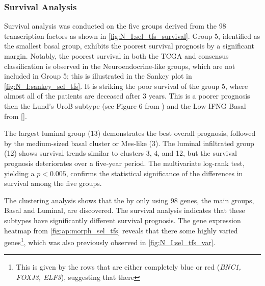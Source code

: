 \subsubsection*{Survival Analysis}

Survival analysis was conducted on the five groups derived from the 98 transcription factors as shown in \cref{fig:N_I:sel_tfs_survival}. Group 5, identified as the smallest basal group, exhibits the poorest survival prognosis by a significant margin. Notably, the poorest survival in both the TCGA and consensus classification is observed in the Neuroendocrine-like groups, which are not included in Group 5; this is illustrated in the Sankey plot in \cref{fig:N_I:sankey_sel_tfs}. It is striking the poor survival of the group 5, where almost all of the patients are deceased after 3 years. This is a poorer prognosis then the Lund's UroB subtype (see Figure 6 from \citet{Marzouka2018-ge}) and the Low IFNG Basal from \ref{}.

The largest luminal group (13) demonstrates the best overall prognosis, followed by the medium-sized basal cluster or Mes-like (3). The luminal infiltrated group (12) shows survival trends similar to clusters 3, 4, and 12, but the survival prognosis deteriorates over a five-year period. The multivariate log-rank test, yielding a $p<0.005$, confirms the statistical significance of the differences in survival among the five groups.

The clustering analysis shows that the by only using 98 genes, the main groups, Basal and Luminal, are discovered. The survival analysis indicates that these subtypes have significantly different survival prognosis. The gene expression heatmap from \cref{fig:ap:morph_sel_tfs} reveals that there some highly varied genes\footnote{This is given by the rows that are either completely blue or red (\textit{BNC1, FOXJ3, ELF3}), suggesting that there }, which was also previously observed in \cref{fig:N_I:sel_tfs_var}. 


